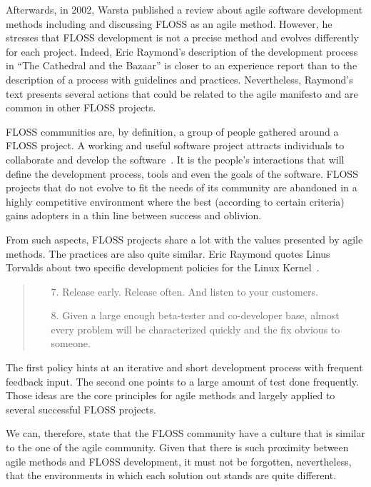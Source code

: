 \documentclass[lnbip]{svmultln}
\begin{document}
Afterwards, in 2002, Warsta \cite{warsta2002} published a review about
agile software development methods including and discussing FLOSS as
an agile method.  However, he stresses that FLOSS development is not a
precise method and evolves differently for each project. Indeed, Eric
Raymond's description of the development process in ``The Cathedral
and the Bazaar'' \cite{raymond1999} is closer to an experience report
than to the description of a process with guidelines and
practices. Nevertheless, Raymond's text presents several actions that
could be related to the agile manifesto \cite{url:agilemanifesto} and
are common in other FLOSS projects.

FLOSS communities are, by definition, a group of people gathered
around a FLOSS project. A working and useful software project attracts
individuals to collaborate and develop the
software~\cite{crowston2002}. It is the people's interactions that
will define the development process, tools and even the goals of the
software. FLOSS projects that do not evolve to fit the needs of its
community are abandoned in a highly competitive environment where the
best (according to certain criteria) gains adopters in a thin line
between success and oblivion.

From such aspects, FLOSS projects share a lot with the values
presented by agile methods. The practices are also quite similar. Eric
Raymond quotes Linus Torvalds about two specific development policies
for the Linux Kernel~\cite{raymond1999}.
\begin{quote}
  \begin{enumerate}
  \item[7.] Release early. Release often. And listen to your
    customers.
  \item[8.] Given a large enough beta-tester and co-developer base,
    almost every problem will be characterized quickly and the fix
    obvious to someone.
  \end{enumerate}
\end{quote}

The first policy hints at an iterative and short development process
with frequent feedback input. The second one points to a large amount
of test done frequently. Those ideas are the core principles for agile
methods and largely applied to several successful FLOSS projects.

We can, therefore, state that the FLOSS community have a culture that
is similar to the one of the agile community. Given that there is such
proximity between agile methods and FLOSS development, it must not be
forgotten, nevertheless, that the environments in which each solution
out stands are quite different.
\end{document}
